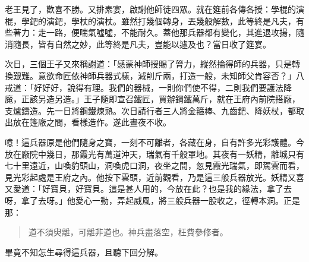 老王見了，歡喜不勝。又排素宴，啟謝他師徒四眾。就在筵前各傳各授：學棍的演棍，學鈀的演鈀，學杖的演杖。雖然打幾個轉身，丟幾般解數，此等終是凡夫，有些著力：走一路，便喘氣噓噓，不能耐久。蓋他那兵器都有變化，其進退攻揚，隨消隨長，皆有自然之妙，此等終是凡夫，豈能以遽及也？當日收了筵宴。

次日，三個王子又來稱謝道：「感蒙神師授賜了膂力，縱然掄得師的兵器，只是轉換艱難。意欲命匠依神師兵器式樣，減削斤兩，打造一般，未知師父肯容否？」八戒道：「好好好，說得有理。我們的器械，一則你們使不得，二則我們要護法降魔，正該另造另造。」王子隨即宣召鐵匠，買辦鋼鐵萬斤，就在王府內前院搭廠，支爐鑄造。先一日將鋼鐵煉熟。次日請行者三人將金箍棒、九齒鈀、降妖杖，都取出放在篷廠之間，看樣造作。遂此晝夜不收。

噫！這兵器原是他們隨身之寶，一刻不可離者，各藏在身，自有許多光彩護體。今放在廠院中幾日，那霞光有萬道沖天，瑞氣有千般罩地。其夜有一妖精，離城只有七十里遠近，山喚豹頭山，洞喚虎口洞，夜坐之間，忽見霞光瑞氣，即駕雲而看，見光彩起處是王府之內。他按下雲頭，近前觀看，乃是這三般兵器放光。妖精又喜又愛道：「好寶貝，好寶貝。這是甚人用的，今放在此？也是我的緣法，拿了去呀，拿了去呀。」他愛心一動，弄起威風，將三般兵器一股收之，徑轉本洞。正是那：
\begin{quote}
道不須臾離，可離非道也。神兵盡落空，枉費參修者。
\end{quote}

畢竟不知怎生尋得這兵器，且聽下回分解。
